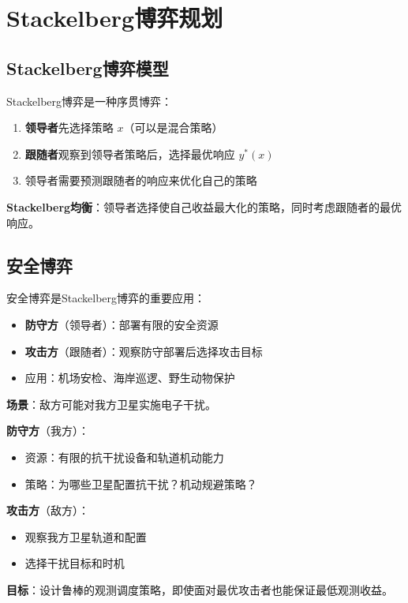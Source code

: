 \section{Stackelberg博弈规划}

\subsection{Stackelberg博弈模型}

\begin{definition}[Stackelberg博弈]
Stackelberg博弈是一种序贯博弈：
\begin{enumerate}
  \item \textbf{领导者}先选择策略 $x$（可以是混合策略）
  \item \textbf{跟随者}观察到领导者策略后，选择最优响应 $y^*(x)$
  \item 领导者需要预测跟随者的响应来优化自己的策略
\end{enumerate}
\end{definition}

\textbf{Stackelberg均衡}：领导者选择使自己收益最大化的策略，同时考虑跟随者的最优响应。

\subsection{安全博弈}

\begin{keypoint}
安全博弈是Stackelberg博弈的重要应用：
\begin{itemize}
  \item \textbf{防守方}（领导者）：部署有限的安全资源
  \item \textbf{攻击方}（跟随者）：观察防守部署后选择攻击目标
  \item 应用：机场安检、海岸巡逻、野生动物保护
\end{itemize}
\end{keypoint}

\begin{example}
\textbf{场景}：敌方可能对我方卫星实施电子干扰。

\textbf{防守方}（我方）：
\begin{itemize}
  \item 资源：有限的抗干扰设备和轨道机动能力
  \item 策略：为哪些卫星配置抗干扰？机动规避策略？
\end{itemize}

\textbf{攻击方}（敌方）：
\begin{itemize}
  \item 观察我方卫星轨道和配置
  \item 选择干扰目标和时机
\end{itemize}

\textbf{目标}：设计鲁棒的观测调度策略，即使面对最优攻击者也能保证最低观测收益。
\end{example}

